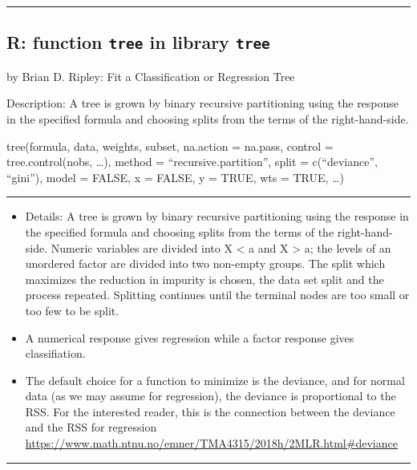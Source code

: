 \documentclass[]{article}
\providecommand{\tightlist}{%
  \setlength{\itemsep}{0pt}\setlength{\parskip}{0pt}}
\begin{document}
\begin{center}\rule{0.5\linewidth}{\linethickness}\end{center}

\hypertarget{r-function-tree-in-library-tree}{%
\subsection{\texorpdfstring{R: function \texttt{tree} in library
\texttt{tree}}{R: function tree in library tree}}\label{r-function-tree-in-library-tree}}

by Brian D. Ripley: Fit a Classification or Regression Tree

Description: A tree is grown by binary recursive partitioning using the
response in the specified formula and choosing splits from the terms of
the right-hand-side.

tree(formula, data, weights, subset, na.action = na.pass, control =
tree.control(nobs, \ldots{}), method = ``recursive.partition'', split =
c(``deviance'', ``gini''), model = FALSE, x = FALSE, y = TRUE, wts =
TRUE, \ldots{})

\begin{center}\rule{0.5\linewidth}{\linethickness}\end{center}

\begin{itemize}
\tightlist
\item
  Details: A tree is grown by binary recursive partitioning using the
  response in the specified formula and choosing splits from the terms
  of the right-hand-side. Numeric variables are divided into X
  \textless{} a and X \textgreater{} a; the levels of an unordered
  factor are divided into two non-empty groups. The split which
  maximizes the reduction in impurity is chosen, the data set split and
  the process repeated. Splitting continues until the terminal nodes are
  too small or too few to be split.
\item
  A numerical response gives regression while a factor response gives
  classifiation.
\item
  The default choice for a function to minimize is the deviance, and for
  normal data (as we may assume for regression), the deviance is
  proportional to the RSS. For the interested reader, this is the
  connection between the deviance and the RSS for regression
  \url{https://www.math.ntnu.no/emner/TMA4315/2018h/2MLR.html\#deviance}
\end{itemize}

\begin{center}\rule{0.5\linewidth}{\linethickness}\end{center}
\end{document}
